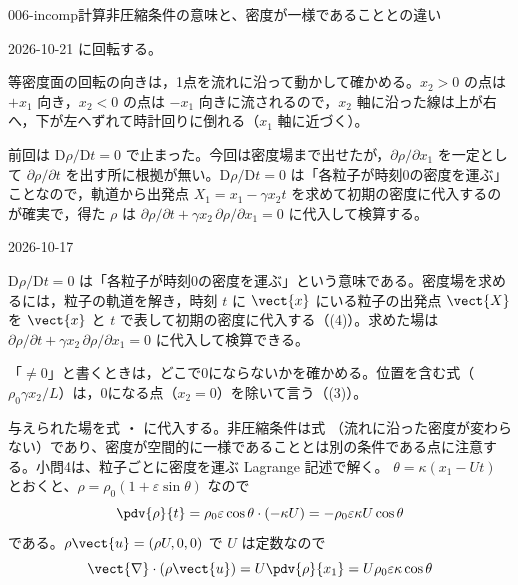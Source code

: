 \documentclass[uplatex,dvipdfmx,a4paper,11pt]{jsarticle}
\begin{document}
\begin{mondai}{006-incomp}{計算}{非圧縮条件の意味と、密度が一様であることとの違い}
\begin{kotaeutsushi}{2026-10-21}
に回転する。
\end{kotaeutsushi}
\begin{kizuki}
\item 等密度面の回転の向きは，1点を流れに沿って動かして確かめる。$x_{2}>0$ の点は $+x_{1}$ 向き，$x_{2}<0$ の点は $-x_{1}$ 向きに流されるので，$x_{2}$ 軸に沿った線は上が右へ，下が左へずれて時計回りに倒れる（$x_{1}$ 軸に近づく）。
\item {}前回は $\mathrm{D}\rho/\mathrm{D}t=0$ で止まった。今回は密度場まで出せたが，$\partial\rho/\partial x_{1}$ を一定として $\partial\rho/\partial t$ を出す所に根拠が無い。$\mathrm{D}\rho/\mathrm{D}t=0$ は「各粒子が時刻0の密度を運ぶ」ことなので，軌道から出発点 $X_{1}=x_{1}-\gamma x_{2}t$ を求めて初期の密度に代入するのが確実で，得た $\rho$ は $\partial\rho/\partial t+\gamma x_{2}\,\partial\rho/\partial x_{1}=0$ に代入して検算する。
\end{kizuki}
\begin{maekizuki}{2026-10-17}
\item $\mathrm{D}\rho/\mathrm{D}t=0$ は「各粒子が時刻0の密度を運ぶ」という意味である。密度場を求めるには，粒子の軌道を解き，時刻 $t$ に $\vect{x}$ にいる粒子の出発点 $\vect{X}$ を $\vect{x}$ と $t$ で表して初期の密度に代入する（(4)）。求めた場は $\partial\rho/\partial t+\gamma x_{2}\,\partial\rho/\partial x_{1}=0$ に代入して検算できる。
\item 「$\neq0$」と書くときは，どこで0にならないかを確かめる。位置を含む式（$\rho_{0}\gamma x_{2}/L$）は，0になる点（$x_{2}=0$）を除いて言う（(3)）。
\end{maekizuki}
\begin{tadashii}
\houshin 与えられた場を式 ・ に代入する。非圧縮条件は式 （流れに沿った密度が変わらない）であり、密度が空間的に一様であることとは別の条件である点に注意する。小問4は、粒子ごとに密度を運ぶ Lagrange 記述で解く。
\keisan {} $\theta = \kappa(x_1 - Ut)$ とおくと、$\rho = \rho_0(1 + \varepsilon\sin\theta)$ なので
\[ \pdv{\rho}{t} = \rho_0\varepsilon\cos\theta\cdot(-\kappa U) = -\rho_0\varepsilon\kappa U\cos\theta \]
である。$\rho\vect{u} = (\rho U, 0, 0)$ で $U$ は定数なので
\[ \vect{\nabla}\cdot(\rho\vect{u}) = U\pdv{\rho}{x_1} = U\rho_0\varepsilon\kappa\cos\theta \]

\end{tadashii}
\end{mondai}
\end{document}
